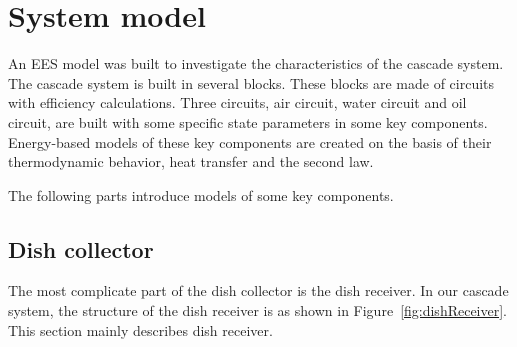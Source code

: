\documentclass{article}
\begin{document}

\section{System model}
An EES model was built to investigate the characteristics of the cascade system. The cascade system is built in several blocks. These blocks are made of circuits with efficiency calculations. Three circuits, air circuit, water circuit and oil circuit, are built with some specific state parameters in some key components. Energy-based models of these key components are created on the basis of their thermodynamic behavior, heat transfer and the second law.

The following parts introduce models of some key components.

\subsection{Dish collector}
The most complicate part of the dish collector is the dish receiver. In our cascade system, the structure of the dish receiver is as shown in Figure~\ref{fig:dishReceiver}. This section mainly describes dish receiver.
\end{document}
